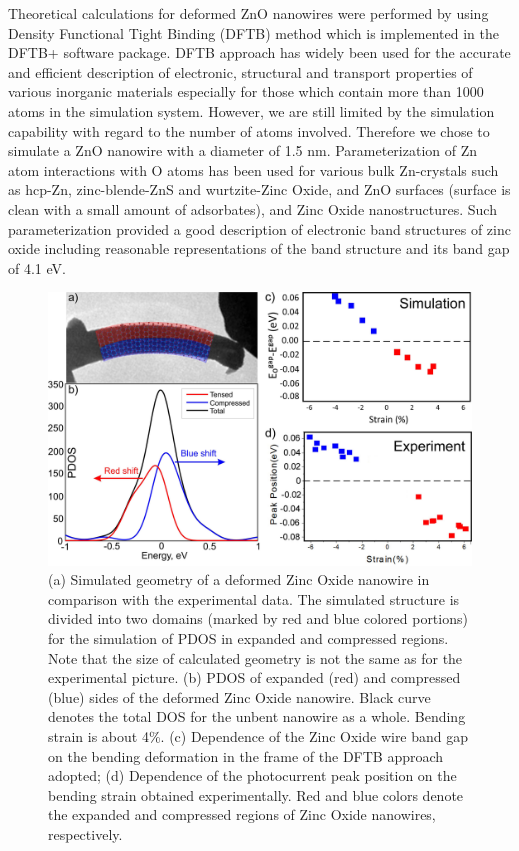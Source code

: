 Theoretical calculations for deformed ZnO nanowires were performed by using Density Functional Tight Binding (DFTB) method which is implemented in the DFTB+ software package.\cite{T.2007} 
DFTB approach has widely been used for the accurate and efficient description of electronic, structural and transport properties of various inorganic materials especially for those which contain more than 1000 atoms in the simulation system. 
However, we are still limited by the simulation capability with regard to the number of atoms involved. 
Therefore we chose to simulate a ZnO nanowire with a diameter of 1.5 nm. 
Parameterization of Zn atom interactions with O atoms has been used for various bulk Zn-crystals such as hcp-Zn, zinc-blende-ZnS and wurtzite-Zinc Oxide, and ZnO surfaces (surface is clean with a small amount of adsorbates), and Zinc Oxide nanostructures. 
Such parameterization provided a good description of electronic band structures of zinc oxide including reasonable representations of the band structure and its band gap of 4.1 eV.\cite{Moreira2009}

\begin{figure}  
\includegraphics[width=\textwidth]{figures/figure5_3}
\caption[DFTB calculation match experimental result]{(a) Simulated geometry of a deformed Zinc Oxide nanowire in comparison with the experimental data. The simulated structure is divided into two domains (marked by red and blue colored portions) for the simulation of PDOS in expanded and compressed regions. Note that the size of calculated geometry is not the same as for the experimental picture. (b) PDOS of expanded (red) and compressed (blue) sides of the deformed Zinc Oxide nanowire. Black curve denotes the total DOS for the unbent nanowire as a whole. Bending strain is about 4\%. (c) Dependence of the Zinc Oxide wire band gap on the bending deformation in the frame of the DFTB approach adopted; (d) Dependence of the photocurrent peak position on the bending strain obtained experimentally. Red and blue colors denote the expanded and compressed regions of Zinc Oxide nanowires, respectively. 
\label{fig:5_3}}
\end{figure}


